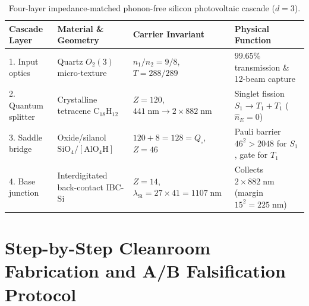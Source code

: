 \documentclass[11pt,a4paper]{article}
\theoremstyle{plain}
\theoremstyle{definition}
\begin{document}
\begin{table}[htbp]
\centering
\caption{Four-layer impedance-matched phonon-free silicon photovoltaic cascade ($d=3$).}
\label{tab:solar-cascade}
\small
\begin{tabular}{@{}llll@{}}
\toprule
\textbf{Cascade Layer} & \textbf{Material \& Geometry} & \textbf{Carrier Invariant} & \textbf{Physical Function} \\
\midrule
1. Input optics & Quartz $O_2(3)$ micro-texture & $n_1/n_2 = 9/8$, $T = 288/289$ & $99.65\%$ transmission \& 12-beam capture \\
2. Quantum splitter & Crystalline tetracene $\mathrm{C_{18}H_{12}}$ & $Z = 120$, $441\;\text{nm}\to 2\times 882\;\text{nm}$ & Singlet fission $S_1\to T_1+T_1$ ($\hat{n}_E=0$) \\
3. Saddle bridge & Oxide/silanol $\mathrm{SiO_4}/[\mathrm{AlO_4H}]$ & $120+8=128=Q_\square$, $Z=46$ & Pauli barrier $46^2>2048$ for $S_1$, gate for $T_1$ \\
4. Base junction & Interdigitated back-contact IBC-$\mathrm{Si}$ & $Z=14$, $\lambda_{\mathrm{Si}}=27\times 41=1107\;\text{nm}$ & Collects $2\times 882\;\text{nm}$ (margin $15^2=225\;\text{nm}$) \\
\bottomrule
\end{tabular}
\end{table}

\section{Step-by-Step Cleanroom Fabrication and A/B Falsification Protocol}
\label{sec:experimental-protocol}
\end{document}
